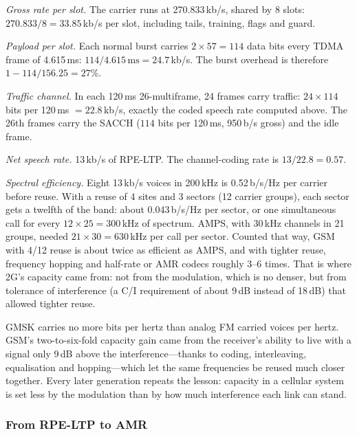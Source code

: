 \begin{worked}
\emph{Gross rate per slot.} The carrier runs at 270.833\,kb/s, shared by 8 slots:
$270.833/8=33.85$\,kb/s per slot, including tails, training, flags and guard.

\emph{Payload per slot.} Each normal burst carries $2\times57=114$ data bits every TDMA frame of
4.615\,ms: $114/4.615\,\mathrm{ms}=24.7$\,kb/s. The burst overhead is therefore
$1-114/156.25=27\%$.

\emph{Traffic channel.} In each 120\,ms 26-multiframe, 24 frames carry traffic: $24\times114$ bits
per 120\,ms $=22.8$\,kb/s, exactly the coded speech rate computed above. The 26th frames carry
the SACCH ($114$ bits per 120\,ms, 950\,b/s gross) and the idle frame.

\emph{Net speech rate.} 13\,kb/s of RPE-LTP. The channel-coding rate is $13/22.8=0.57$.

\emph{Spectral efficiency.} Eight 13\,kb/s voices in 200\,kHz is 0.52\,b/s/Hz per carrier before
reuse. With a reuse of 4 sites and 3 sectors (12 carrier groups), each sector gets a twelfth of the
band: about 0.043\,b/s/Hz per sector, or one simultaneous call for every $12\times25=300$\,kHz of
spectrum. AMPS, with 30\,kHz channels in 21 groups, needed $21\times30=630$\,kHz per call per
sector. Counted that way, GSM with 4/12 reuse is about twice as efficient as AMPS, and with tighter
reuse, frequency hopping and half-rate or AMR codecs roughly 3--6 times. That is where 2G's capacity
came from: not from the modulation, which is no denser, but from tolerance of interference (a C/I
requirement of about 9\,dB instead of 18\,dB) that allowed tighter reuse.
\end{worked}

\begin{keyidea}
GMSK carries no more bits per hertz than analog FM carried voices per hertz. GSM's two-to-six-fold
capacity gain came from the receiver's ability to live with a signal only 9\,dB above the
interference---thanks to coding, interleaving, equalisation and hopping---which let the same
frequencies be reused much closer together. Every later generation repeats the lesson: capacity in
a cellular system is set less by the modulation than by how much interference each link can stand.
\end{keyidea}

\subsubsection{From RPE-LTP to AMR}

